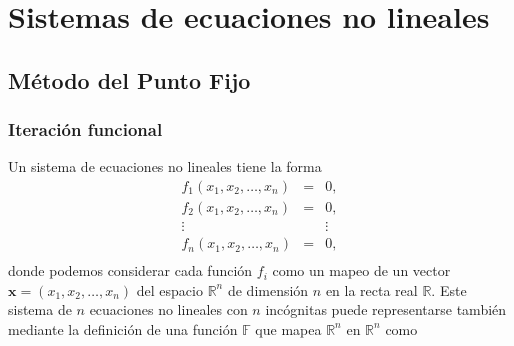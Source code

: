 \chapter{Sistemas de ecuaciones no lineales}


\section{Método del Punto Fijo}
\subsection{Iteración funcional}

Un sistema de ecuaciones no lineales tiene la forma
\begin{equation}
	\begin{matrix}
		f_1(x_1,x_2,\dots,x_n) & = & 0,\\
		f_2(x_1,x_2,\dots,x_n) & = & 0,\\
		\vdots & & \vdots\\
		f_n(x_1,x_2,\dots,x_n) & = & 0,\\	
	\end{matrix}
	\label{eq:SNLpuntoFijo1} 	
\end{equation}
donde podemos considerar cada función $f_i$ como un mapeo de un vector $\textbf{x}=(x_1,x_2,\dots,x_n)$ del espacio $\mathbb{R}^n$ 
de dimensión $n$ en la recta real $\mathbb{R}$. 
Este sistema de $n$ ecuaciones no lineales con $n$ incógnitas puede representarse también mediante la definición de una función 
$\mathbb{F}$ que mapea $\mathbb{R}^n$ en $\mathbb{R}^n$ como
 
